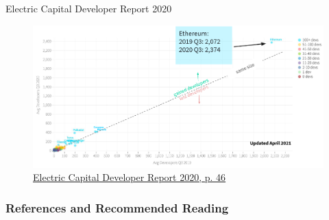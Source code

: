 \documentclass[]{beamer}
\begin{document}

\begin{frame}{Electric Capital Developer Report 2020}
	
	\begin{figure}
		\includegraphics[width=\textwidth]{../assets/images/electric_capital}
		
		\caption{\footnotesize  \href{https://github.com/electric-capital/developer-reports}{\link Electric Capital Developer Report 2020, p. 46} \cite{EC20}} 
	\end{figure}


\end{frame}



\begin{frame}%
\frametitle{References and Recommended Reading}
	
	
\end{frame}
\end{document}
